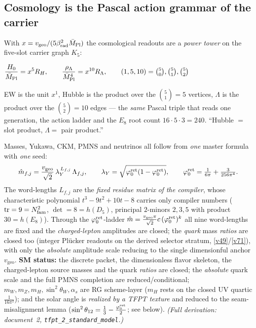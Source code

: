 \subsection*{Cosmology is the Pascal action grammar of the carrier}
\noindent With $x=v_{\mathrm{geo}}/(5\beta_{\mathrm{rad}}^2\bar M_{\mathrm{Pl}})$ the cosmological readouts are a \emph{power tower}
on the five-slot carrier graph $K_5$:
\begin{keyeq}
$\displaystyle \frac{H_0}{\bar M_{\mathrm{Pl}}}=x^{5}R_H,\qquad \frac{\rho_\Lambda}{\bar M_{\mathrm{Pl}}^4}=x^{10}R_\Lambda,\qquad
  (1,5,10)=\tbinom50,\tbinom51,\tbinom52$
\end{keyeq}
EW is the unit $x^1$, Hubble is the product over the $\binom51=5$ vertices, $\Lambda$ is the product over
the $\binom52=10$ edges --- the \emph{same} Pascal triple that reads one generation, the action ladder
and the $E_8$ root count $16\cdot5\cdot3=240$. ``Hubble $=$ slot product, $\Lambda=$ pair product.'' \mE

\TFPTactionkfive

\begin{winboxnb}
Masses, Yukawa, CKM, PMNS and neutrinos all follow from \emph{one} master formula with \emph{one} seed:
\[
  \hat m_{f,j}=\frac{v_{\mathrm{geo}}}{\sqrt2}\,\lambda_Y^{\,L_{f,j}}\,\Lambda_{f,j},\qquad
  \lambda_Y=\sqrt{\varphi_0^{\mathrm{ret}}(1-\varphi_0^{\mathrm{ret}})},\qquad \varphi_0^{\mathrm{ret}}=\tfrac1{6\pi}+\tfrac3{256\pi^4}.
\]
The word-lengths $L_{f,j}$ are the \emph{fixed residue matrix of the compiler}, whose characteristic
polynomial $t^3-9t^2+10t-8$ carries only compiler numbers ($\operatorname{tr}=9=N_{\mathrm{fam}}^2$,
$\det=8=h(D_5)$, principal $2$-minors $2{,}3{,}5$ with product $30=h(E_8)$). Through the $\varphi_0^{\mathrm{ret}}$-ladder
$\hat m=\tfrac{v_{\mathrm{geo}}\pi}{\sqrt2}c\,(\varphi_0^{\mathrm{ret}})^k$ all nine word-lengths are fixed and the
\emph{charged-lepton} amplitudes are closed; the \emph{quark} mass \emph{ratios} are closed too (integer
Pl\"ucker readouts on the derived selector stratum, \vref{v49}/\vref{v71}), with only the \emph{absolute} amplitude scale
reducing to the single dimensionful anchor $v_{\mathrm{geo}}$.
\textbf{SM status:} the discrete packet, the dimensionless flavor skeleton, the charged-lepton source
masses and the quark \emph{ratios} are closed; the \emph{absolute} quark scale and the full PMNS completion
are reduced/conditional;
$m_W,m_Z,m_H,\sin^2\theta_W,\alpha_s$ are RG scheme-layer ($m_H$ rests on the closed UV quartic
$\tfrac1{16\pi^2}$); and the solar angle is \emph{realized by a TFPT texture} and reduced to the
seam-misalignment lemma ($\sin^2\theta_{12}=\tfrac13-\tfrac{\varphi_0^{\mathrm{ret}}}{2}$; see below). \emph{(Full derivation:
document~2, \texttt{tfpt\_2\_standard\_model}.)}
  
\end{winboxnb}

